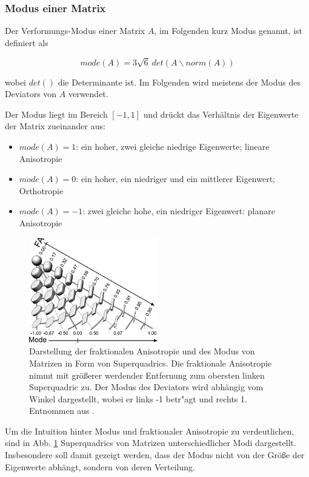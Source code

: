 \documentclass[a4paper,fontsize=12pt,toc=bib,halfparskip]{scrartcl}
\begin{document}
\subsubsection{Modus einer Matrix}
Der Verformungs-Modus \cite{criscione2000invariant} einer Matrix $A$, im Folgenden kurz Modus genannt, ist definiert als

\begin{equation}
	mode(A) = 3\sqrt{6}~det(A\backslash norm(A))
\end{equation}

wobei $det()$ die Determinante ist. Im Folgenden wird meistens der Modus des Deviators von $A$ verwendet.

Der Modus liegt im Bereich $[-1,1]$ und dr\"uckt das Verh\"altnis der Eigenwerte der Matrix zueinander aus:

\begin{itemize}
	\item $mode(A) = 1$: ein hoher, zwei gleiche niedrige Eigenwerte; lineare Anisotropie
	\item $mode(A) = 0$: ein hoher, ein niedriger und ein mittlerer Eigenwert; Orthotropie
	\item $mode(A) = -1$: zwei gleiche hohe, ein niedriger Eigenwert: planare Anisotropie
\end{itemize} 

\begin{figure}
	\centering
	\includegraphics[width=0.5\textwidth]{pictures/001.png}
	\caption{Darstellung der fraktionalen Anisotropie und des Modus von Matrizen in Form von Superquadrics\cite{kindlmann2004superquadric}. Die fraktionale Anisotropie nimmt mit gr\"o{\ss}erer werdender Entfernung zum obersten linken Superquadric zu. Der Modus des Deviators wird abh\"angig vom Winkel dargestellt, wobei er links -1 betr"agt und rechts 1. Entnommen aus \cite[S.~140]{ennis2006orthogonal}.}
	\label{Modus}
\end{figure}
Um die Intuition hinter Modus und fraktionaler Anisotropie zu verdeutlichen, sind in Abb. \ref{Modus} Superquadrics von Matrizen unterschiedlicher Modi dargestellt. Insbesondere soll damit gezeigt werden, dass der Modus nicht von der Gr\"o{\ss}e der Eigenwerte abh\"angt, sondern von deren Verteilung.
\end{document}
